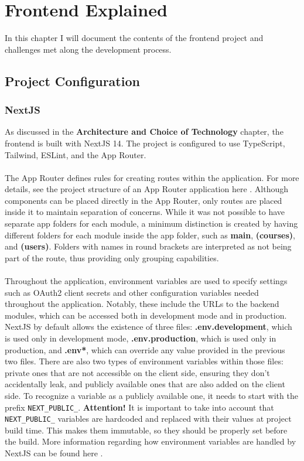 \chapter{Frontend Explained}

In this chapter I will document the contents of the frontend project and challenges met along the development process.

\section{Project Configuration}
\subsection{NextJS}

\noindent As discussed in the \textbf{Architecture and Choice of Technology} chapter, the frontend is built with NextJS 14. The project is configured to use TypeScript, Tailwind, ESLint, and the App Router.
\\\\
\noindent The App Router defines rules for creating routes within the application. For more details, see the project structure of an App Router application here \cite{nextjs-app-router-folders}. Although components can be placed directly in the App Router, only routes are placed inside it to maintain separation of concerns. While it was not possible to have separate app folders for each module, a minimum distinction is created by having different folders for each module inside the app folder, such as \textbf{main}, \textbf{(courses)}, and \textbf{(users)}. Folders with names in round brackets are interpreted as not being part of the route, thus providing only grouping capabilities.
\\\\
\noindent Throughout the application, environment variables are used to specify settings such as OAuth2 client secrets and other configuration variables needed throughout the application. Notably, these include the URLs to the backend modules, which can be accessed both in development mode and in production. NextJS by default allows the existence of three files: \textbf{.env.development}, which is used only in development mode, \textbf{.env.production}, which is used only in production, and \textbf{.env*}, which can override any value provided in the previous two files. There are also two types of environment variables within those files: private ones that are not accessible on the client side, ensuring they don't accidentally leak, and publicly available ones that are also added on the client side. To recognize a variable as a publicly available one, it needs to start with the prefix \texttt{NEXT\_PUBLIC\_}. \textbf{Attention!} It is important to take into account that \texttt{NEXT\_PUBLIC\_} variables are hardcoded and replaced with their values at project build time. This makes them immutable, so they should be properly set before the build. More information regarding how environment variables are handled by NextJS can be found here \cite{nextjs-env-variables}.

